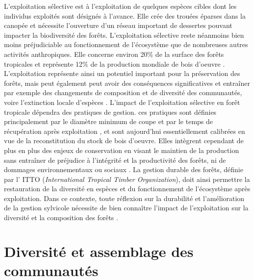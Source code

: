 \documentclass[
  11pt,
  french,
  A4paper,
  extrafontsizes,onecolumn,openright
  ]{memoir}
\begin{document}
L'exploitation sélective est à l'exploitation de quelques espèces cibles
dont les individus exploités sont désignés à l'avance. Elle crée des
trouées éparses dans la canopée et nécessite l'ouverture d'un réseau
important de dessertes pouvant impacter la biodiversité des forêts.
L'exploitation sélective reste néanmoins bien moins préjudiciable au
fonctionnement de l'écosystème que de nombreuses autres activités
anthropiques. Elle concerne environ 20\% de la surface des forêts
tropicales et représente 12\% de la production mondiale de bois d'oeuvre
\autocite{Martin2015}. L'exploitation représente ainsi un potentiel
important pour la préservation des forêts, mais peut également peut
avoir des conséquences significatives et entraîner par exemple des
changements de composition et de diversité des communautés, voire
l'extinction locale d'espèces \autocite{Gibson2011}. L'impact de
l'exploitation sélective en forêt tropicale dépendra des pratiques de
gestion. ces pratiques sont définies principalement par le diamètre
minimum de coupe et par le temps de récupération après exploitation
\autocite{Sist2015}, et sont aujourd'hui essentiellement calibrées en
vue de la reconstitution du stock de bois d'oeuvre. Elles intègrent
cependant de plus en plus des enjeux de conservation en visant le
maintien de la production sans entraîner de préjudice à l'intégrité et
la productivité des forêts, ni de dommages environnementaux ou sociaux
\autocite{ITTO2005}. La gestion durable des forêts, définie par l' ITTO
(\emph{International Tropical Timber Organization}), doit ainsi
permettre la restauration de la diversité en espèces et du
fonctionnement de l'écosystème après exploitation. Dans ce contexte,
toute réflexion sur la durabilité et l'amélioration de la gestion
sylvicole nécessite de bien connaître l'impact de l'exploitation sur la
diversité et la composition des forêts .

\section{Diversité et assemblage des
communautés}\label{diversite-et-assemblage-des-communautes}
\end{document}
